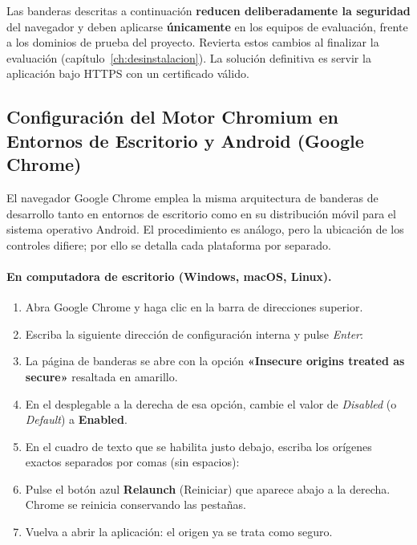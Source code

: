 \begin{AlertaSeguridad}
Las banderas descritas a continuación \textbf{reducen deliberadamente la seguridad} del
navegador y deben aplicarse \textbf{únicamente} en los equipos de evaluación, frente a los
dominios de prueba del proyecto. Revierta estos cambios al finalizar la evaluación
(capítulo~\ref{ch:desinstalacion}). La solución definitiva es servir la aplicación bajo
HTTPS con un certificado válido.
\end{AlertaSeguridad}

\subsection[Google Chrome (Escritorio y Android)]{Configuración del Motor Chromium en Entornos de Escritorio y Android (Google Chrome)}%
\label{subsec:chrome}

El navegador Google Chrome emplea la misma arquitectura de banderas de desarrollo tanto en
entornos de escritorio como en su distribución móvil para el sistema operativo Android. El
procedimiento es análogo, pero la ubicación de los controles difiere; por ello se detalla
cada plataforma por separado.\par

\paragraph{En computadora de escritorio (Windows, macOS, Linux).}
\begin{enumerate}[noitemsep]
    \item Abra Google Chrome y haga clic en la barra de direcciones superior.
    \item Escriba la siguiente dirección de configuración interna y pulse \textit{Enter}:\par
    \item La página de banderas se abre con la opción \textbf{«Insecure origins treated as secure»} resaltada en amarillo.
    \item En el desplegable a la derecha de esa opción, cambie el valor de \textit{Disabled} (o \textit{Default}) a \textbf{Enabled}.
    \item En el cuadro de texto que se habilita justo debajo, escriba los orígenes exactos separados por comas (sin espacios):\par
    \item Pulse el botón azul \textbf{Relaunch} (Reiniciar) que aparece abajo a la derecha. Chrome se reinicia conservando las pestañas.
    \item Vuelva a abrir la aplicación: el origen ya se trata como seguro.
\end{enumerate}

